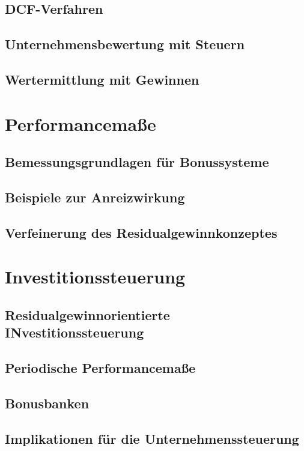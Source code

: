 \documentclass[leqno]{scrartcl}
\begin{document}
\begin{multicols}{3}
\subsection{DCF-Verfahren}
\subsection{Unternehmensbewertung mit Steuern}
\subsection{Wertermittlung mit Gewinnen}

\section{Performancemaße}

\subsection{Bemessungsgrundlagen für Bonussysteme}
\subsection{Beispiele zur Anreizwirkung}
\subsection{Verfeinerung des Residualgewinnkonzeptes}

\section{Investitionssteuerung}

\subsection{Residualgewinnorientierte INvestitionssteuerung}
\subsection{Periodische Performancemaße}
\subsection{Bonusbanken}
\subsection{Implikationen für die Unternehmenssteuerung}

\end{multicols}
\end{document}
